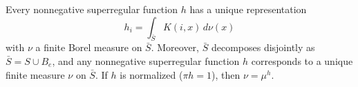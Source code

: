 Every nonnegative superregular function $h$ has a unique representation
$$h_i = \int_{\bar{S}} K(i, x) \, d\nu(x)$$
with $\nu$ a finite Borel measure on $\bar{S}$. Moreover, $\bar{S}$ decomposes disjointly as $\bar{S} = S \cup B_e$, and any nonnegative superregular function $h$ corresponds to a unique finite measure $\nu$ on $\bar{S}$. If $h$ is normalized ($\pi h = 1$), then $\nu = \mu^h$.
